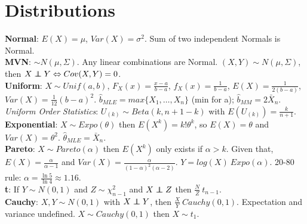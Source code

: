 \section*{Distributions}
\textbf{Normal}: $E(X)= \mu$, $Var(X) = \sigma^2$. Sum of two independent Normals is Normal. \\
\textbf{MVN}: $\sim N(\mu, \Sigma)$. Any linear combinations are Normal. $(X,Y) \sim N(\mu, \Sigma)$, then $X\independent Y \Leftrightarrow Cov(X,Y) = 0$. \\
\textbf{Uniform}: $X\sim Unif(a,b)$, $F_X(x) = \frac{x-a}{b-a}$, $f_X(x) = \frac{1}{b-a}$, $E(X) = \frac{1}{2(b-a)}$, $Var(X) = \frac{1}{12}(b-a)^2$. $\hat{b}_{MLE} = max\{X_1, \ldots, X_n\}$ (min for a); $\hat{b}_{MM} = 2\bar{X}_n$.\\
\textit{Uniform Order Statistics}: $U_{(k)} \sim Beta(k, n+1-k)$ with $E(U_{(k)}) = \frac{k}{n+1}$.
\textbf{Exponential}: $X\sim Expo(\theta)$ then $E(X^k) = k!\theta^k$, so $E(X) = \theta$ and $Var(X) = \theta^2$. $\hat{\theta}_{MLE} = \bar{X}_n$.\\
\textbf{Pareto}: $X\sim Pareto(\alpha)$ then $E(X^k)$ only exists if $\alpha>k$. Given that, $E(X) = \frac{\alpha}{\alpha-1}$ and $Var(X) = \frac{\alpha}{(1-\alpha)^2(\alpha-2)}$. $Y = log(X) ~ Expo(\alpha)$. 20-80 rule: $\alpha = \frac{\ln 5}{\ln 4}\approx 1.16$.\\
\textbf{t}: If $Y\sim N(0,1)$ and $Z\sim \chi^2_{n-1}$ and $X\independent Z$ then $\frac{N}{Z}~t_{n-1}$.\\
\textbf{Cauchy}: $X, Y \sim N(0, 1)$ with $X\independent Y$, then $\frac{X}{Y}~Cauchy(0,1)$. Expectation and variance undefined. $X\sim Cauchy(0,1)$ then $X\sim t_1$.
\vfill